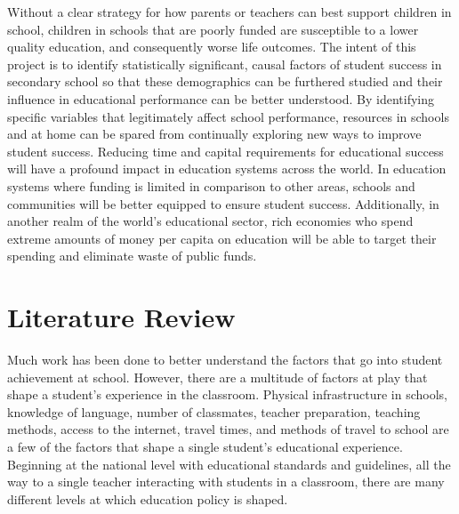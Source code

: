 \documentclass[12pt,english]{article}
\begin{document}
Without a clear strategy for how parents or teachers can best support children in school, children in schools that are poorly funded are susceptible to a lower quality education, and consequently worse life outcomes. The intent of this project is to identify statistically significant, causal factors of student success in secondary school so that these demographics can be furthered studied and their influence in educational performance can be better understood. By identifying specific variables that legitimately affect school performance, resources in schools and at home can be spared from continually exploring new ways to improve student success. Reducing time and capital requirements for educational success will have a profound impact in education systems across the world. In education systems where funding is limited in comparison to other areas, schools and communities will be better equipped to ensure student success. Additionally, in another realm of the world's educational sector, rich economies who spend extreme amounts of money per capita on education will be able to target their spending and eliminate waste of public funds.

\section{Literature Review}\label{sec:litreview}
Much work has been done to better understand the factors that go into student achievement at school. However, there are a multitude of factors at play that shape a student's experience in the classroom. Physical infrastructure in schools, knowledge of language, number of classmates, teacher preparation, teaching methods, access to the internet, travel times, and methods of travel to school are a few of the factors that shape a single student's educational experience. Beginning at the national level with educational standards and guidelines, all the way to a single teacher interacting with students in a classroom, there are many different levels at which education policy is shaped.
\end{document}
